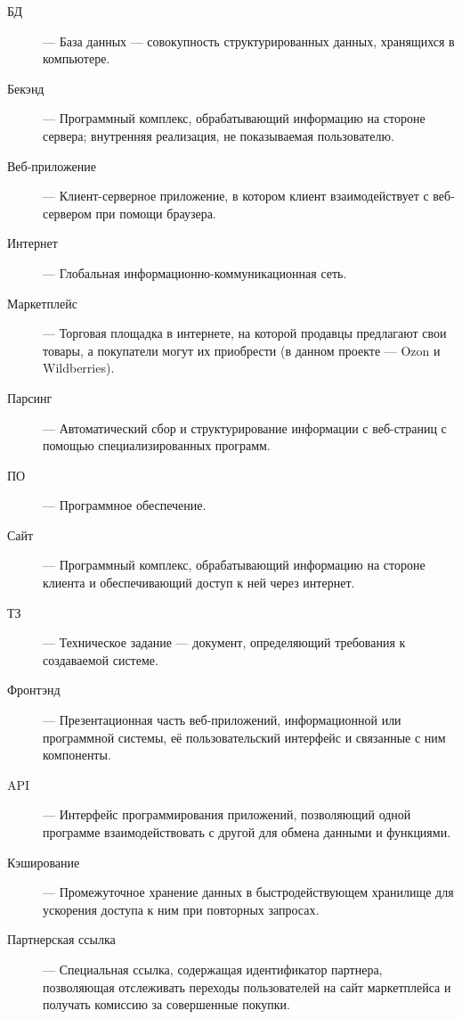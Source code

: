 \documentclass[a4paper,12pt]{article}
\begin{document}
\begin{description}
	\item[БД] — База данных — совокупность структурированных данных, хранящихся в компьютере.
	
	\item[Бекэнд] — Программный комплекс, обрабатывающий информацию на стороне сервера; внутренняя реализация, не показываемая пользователю.
	
	\item[Веб-приложение] — Клиент-серверное приложение, в котором клиент взаимодействует с веб-сервером при помощи браузера.
	
	\item[Интернет] — Глобальная информационно-коммуникационная сеть.
	
	\item[Маркетплейс] — Торговая площадка в интернете, на которой продавцы предлагают свои товары, а покупатели могут их приобрести (в данном проекте — Ozon и Wildberries).
	
	\item[Парсинг] — Автоматический сбор и структурирование информации с веб-страниц с помощью специализированных программ.
	
	\item[ПО] — Программное обеспечение.
	
	\item[Сайт] — Программный комплекс, обрабатывающий информацию на стороне клиента и обеспечивающий доступ к ней через интернет.
	
	\item[ТЗ] — Техническое задание — документ, определяющий требования к создаваемой системе.
	
	\item[Фронтэнд] — Презентационная часть веб-приложений, информационной или программной системы, её пользовательский интерфейс и связанные с ним компоненты.
	
	\item[API] — Интерфейс программирования приложений, позволяющий одной программе взаимодействовать с другой для обмена данными и функциями.
	
	\item[Кэширование] — Промежуточное хранение данных в быстродействующем хранилище для ускорения доступа к ним при повторных запросах.
	
	\item[Партнерская ссылка] — Специальная ссылка, содержащая идентификатор партнера, позволяющая отслеживать переходы пользователей на сайт маркетплейса и получать комиссию за совершенные покупки.
\end{description}
\end{document}
